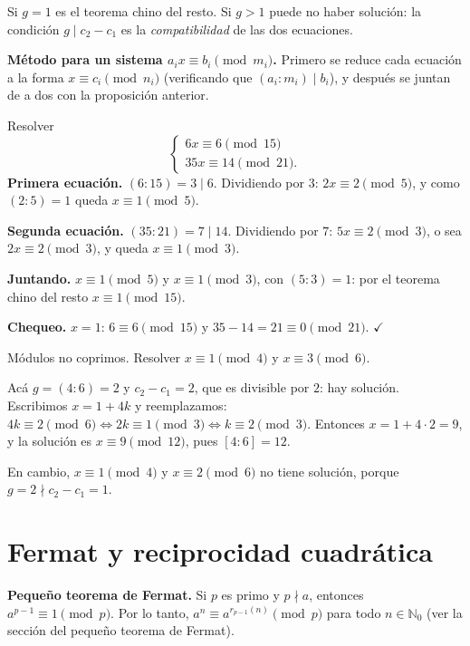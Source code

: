 \begin{nota}
Si $g=1$ es el teorema chino del resto. Si $g>1$ puede no haber solución: la
condición $g\mid c_2-c_1$ es la \emph{compatibilidad} de las dos ecuaciones.
\end{nota}

\begin{nota}
\textbf{Método para un sistema $a_ix\equiv b_i \pmod{m_i}$.} Primero se reduce
cada ecuación a la forma $x\equiv c_i \pmod{n_i}$ (verificando que $(a_i:m_i)\mid b_i$),
y después se juntan de a dos con la proposición anterior.
\end{nota}

\begin{ejemplo}
Resolver
\[
\begin{cases}
6x\equiv 6 \pmod{15}\\
35x\equiv 14 \pmod{21}.
\end{cases}
\]
\textbf{Primera ecuación.} $(6:15)=3\mid 6$. Dividiendo por $3$:
$2x\equiv 2 \pmod 5$, y como $(2:5)=1$ queda $x\equiv 1 \pmod 5$.

\textbf{Segunda ecuación.} $(35:21)=7\mid 14$. Dividiendo por $7$:
$5x\equiv 2 \pmod 3$, o sea $2x\equiv 2 \pmod 3$, y queda $x\equiv 1 \pmod 3$.

\textbf{Juntando.} $x\equiv 1 \pmod 5$ y $x\equiv 1 \pmod 3$, con $(5:3)=1$:
por el teorema chino del resto $x\equiv 1 \pmod{15}$.

\textbf{Chequeo.} $x=1$: $6\equiv 6 \pmod{15}$ y $35-14=21\equiv 0 \pmod{21}$. $\checkmark$
\end{ejemplo}

\begin{ejemplo}
Módulos no coprimos. Resolver $x\equiv 1 \pmod 4$ y $x\equiv 3 \pmod 6$.

Acá $g=(4:6)=2$ y $c_2-c_1=2$, que es divisible por $2$: hay solución. Escribimos
$x=1+4k$ y reemplazamos: $4k\equiv 2 \pmod 6 \iff 2k\equiv 1 \pmod 3 \iff k\equiv 2 \pmod 3$.
Entonces $x=1+4\cdot 2=9$, y la solución es $x\equiv 9 \pmod{12}$, pues
$[4:6]=12$.

En cambio, $x\equiv 1 \pmod 4$ y $x\equiv 2 \pmod 6$ no tiene solución, porque
$g=2\nmid c_2-c_1=1$.
\end{ejemplo}

\section{Fermat y reciprocidad cuadrática}

\begin{nota}
\textbf{Pequeño teorema de Fermat.} Si $p$ es primo y $p\nmid a$, entonces
$a^{p-1}\equiv 1 \pmod p$. Por lo tanto, $a^n\equiv a^{r_{p-1}(n)} \pmod p$ para
todo $n\in\mathbb{N}_0$ (ver la sección del pequeño teorema de Fermat).
\end{nota}

